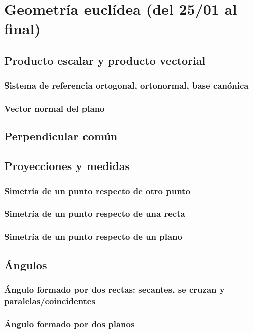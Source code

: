 \section{Geometría euclídea (del 25/01 al final)}

\subsection{Producto escalar y producto vectorial}
\subsubsection{Sistema de referencia ortogonal, ortonormal, base canónica}
\subsubsection{Vector normal del plano}
\subsection{Perpendicular común}

\subsection{Proyecciones y medidas}
\subsubsection{Simetría de un punto respecto de otro punto}
\subsubsection{Simetría de un punto respecto de una recta}
\subsubsection{Simetría de un punto respecto de un plano}

\newpage
\subsection{Ángulos}
\subsubsection{Ángulo formado por dos rectas: secantes, se cruzan y paralelas/coincidentes}
\subsubsection{Ángulo formado por dos planos}
